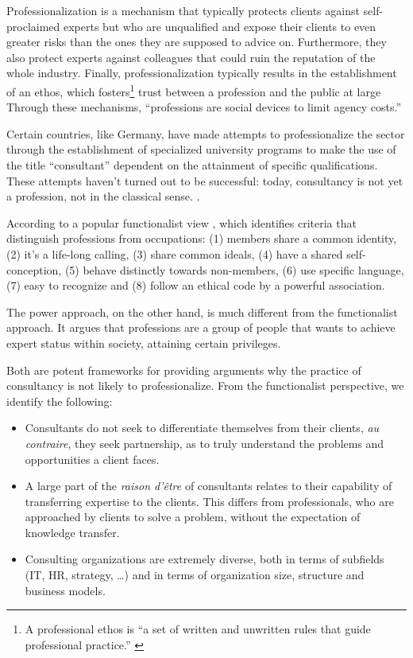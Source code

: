 \documentclass[12pt]{article}
\begin{document}
Professionalization is a mechanism that typically protects clients
against self-proclaimed experts but who are unqualified and expose their
clients to even greater risks than the ones they are supposed to advice
on. \citep[ 71]{kieser2006} Furthermore, they also protect experts
against colleagues that could ruin the reputation of the whole industry.
Finally, professionalization typically results in the establishment of
an ethos, which fosters\footnote{A professional ethos is ``a set of
  written and unwritten rules that guide professional practice.''
  \citep{enstad2017}} trust between a profession and the public at large
\citep{sokolowski1991} Through these mechanisms, ``professions are
social devices to limit agency costs.'' \citep[ 276]{shapiro2005}

Certain countries, like Germany, have made attempts to professionalize
the sector through the establishment of specialized university programs
to make the use of the title ``consultant'' dependent on the attainment
of specific qualifications. These attempts haven't turned out to be
successful: today, consultancy is not yet a profession, not in the
classical sense. \citep[ 73]{kieser2006}.

According to a popular functionalist view \citep{goode1957}, which
identifies criteria that distinguish professions from occupations: (1)
members share a common identity, (2) it's a life-long calling, (3) share
common ideals, (4) have a shared self-conception, (5) behave distinctly
towards non-members, (6) use specific language, (7) easy to recognize
and (8) follow an ethical code by a powerful association.

The power approach, on the other hand, is much different from the
functionalist approach. It argues that professions are a group of people
that wants to achieve expert status within society, attaining certain
privileges. \citep[ 75]{kieser2006}

Both are potent frameworks for providing arguments why the practice of
consultancy is not likely to professionalize. From the functionalist
perspective, we identify the following:

\begin{itemize}
\item
  Consultants do not seek to differentiate themselves from their
  clients, \emph{au contraire}, they seek partnership, as to truly
  understand the problems and opportunities a client faces.
  \citep{fincham2006}
\item
  A large part of the \emph{raison d'être} of consultants relates to
  their capability of transferring expertise to the clients. This
  differs from professionals, who are approached by clients to solve a
  problem, without the expectation of knowledge transfer.
  \citep{oakley1993}
\item
  Consulting organizations are extremely diverse, both in terms of
  subfields (IT, HR, strategy, \ldots) and in terms of organization
  size, structure and business models. \citep[ 79, 89]{kieser2006}
\end{itemize}
\end{document}
